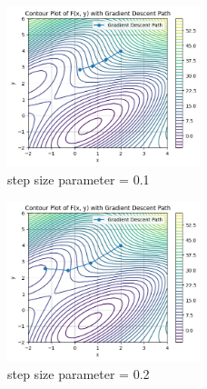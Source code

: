 \begin{multicols}{2} %
    \begin{figure}[H]
        \centering
        \includegraphics[width=0.5\textwidth]{pic/Gradient_Descent_Path_01.png}
        \caption{step size parameter = 0.1}
    \end{figure}
    \columnbreak
    \begin{figure}[H]
        \centering
        \includegraphics[width=0.5\textwidth]{pic/Gradient_Descent_Path_02.png}
        \caption{step size parameter = 0.2}
    \end{figure}
\end{multicols}

